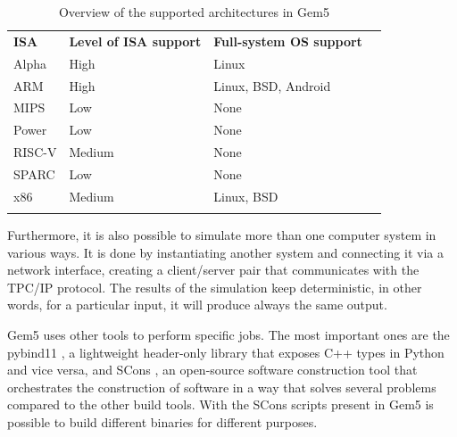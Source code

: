 \begin{table}[H]
\centering
\begin{tabular}{llll}
\cline{1-3}
\multicolumn{1}{|l|}{\cellcolor[HTML]{9B9B9B}\textbf{ISA}} & \multicolumn{1}{l|}{\cellcolor[HTML]{9B9B9B}\textbf{Level of ISA support}} & \multicolumn{1}{l|}{\cellcolor[HTML]{9B9B9B}\textbf{Full-system OS support}} &  \\ \cline{1-3}
\multicolumn{1}{|l|}{Alpha} & \multicolumn{1}{l|}{High} & \multicolumn{1}{l|}{Linux} &  \\ \cline{1-3}
\multicolumn{1}{|l|}{ARM} & \multicolumn{1}{l|}{High} & \multicolumn{1}{l|}{Linux, BSD, Android} &  \\ \cline{1-3}
\multicolumn{1}{|l|}{MIPS} & \multicolumn{1}{l|}{Low} & \multicolumn{1}{l|}{None} &  \\ \cline{1-3}
\multicolumn{1}{|l|}{Power} & \multicolumn{1}{l|}{Low} & \multicolumn{1}{l|}{None} &  \\ \cline{1-3}
\multicolumn{1}{|l|}{RISC-V} & \multicolumn{1}{l|}{Medium} & \multicolumn{1}{l|}{None} &  \\ \cline{1-3}
\multicolumn{1}{|l|}{SPARC} & \multicolumn{1}{l|}{Low} & \multicolumn{1}{l|}{None} &  \\ \cline{1-3}
\multicolumn{1}{|l|}{x86} & \multicolumn{1}{l|}{Medium} & \multicolumn{1}{l|}{Linux, BSD} &  \\ \cline{1-3}
 &  &  & 
\end{tabular}
\caption{Overview of the supported architectures in Gem5 \cite{hempelsimulation}}
\label{tab_ISAsupport}
\end{table}

Furthermore, it is also possible to simulate more than one computer system in various ways. It is done by instantiating another system and connecting it via a network interface, creating a client/server pair that communicates with the TPC/IP protocol. The results of the simulation keep deterministic, in other words, for a particular input, it will produce always the same output. 

Gem5 uses other tools to perform specific jobs. The most important ones are the pybind11 \cite{jakob2019pybind11}, a lightweight header-only library that exposes C++ types in Python and vice versa, and SCons \cite{knight2002scons}, an open-source software construction tool that orchestrates the construction of software in a way that solves several problems compared to the other build tools. With the SCons scripts present in Gem5 is possible to build different binaries for different purposes. 

